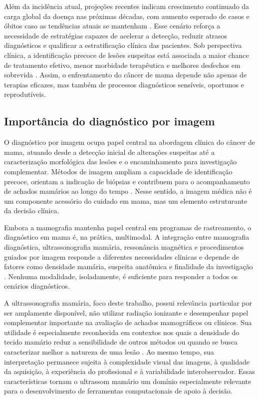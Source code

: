 \documentclass[tcc,capa]{texufpel}
\begin{document}
Além da incidência atual, projeções recentes indicam crescimento continuado da carga global da doença nas próximas décadas, com aumento esperado de casos e óbitos caso as tendências atuais se mantenham \cite{IARC2025}. Esse cenário reforça a necessidade de estratégias capazes de acelerar a detecção, reduzir atrasos diagnósticos e qualificar a estratificação clínica das pacientes. Sob perspectiva clínica, a identificação precoce de lesões suspeitas está associada a maior chance de tratamento efetivo, menor morbidade terapêutica e melhores desfechos em sobrevida \cite{WHOEarlyDiagnosis,INCADeteccao}. Assim, o enfrentamento do câncer de mama depende não apenas de terapias eficazes, mas também de processos diagnósticos sensíveis, oportunos e reprodutíveis.

\subsection{Importância do diagnóstico por imagem}

O diagnóstico por imagem ocupa papel central na abordagem clínica do câncer de mama, atuando desde a detecção inicial de alterações suspeitas até a caracterização morfológica das lesões e o encaminhamento para investigação complementar. Métodos de imagem ampliam a capacidade de identificação precoce, orientam a indicação de biópsias e contribuem para o acompanhamento de achados mamários ao longo do tempo \cite{INCADeteccao,INCADiretrizesMama}. Nesse sentido, a imagem médica não é um componente acessório do cuidado em mama, mas um elemento estruturante da decisão clínica.

Embora a mamografia mantenha papel central em programas de rastreamento, o diagnóstico em mama é, na prática, multimodal. A integração entre mamografia diagnóstica, ultrassonografia mamária, ressonância magnética e procedimentos guiados por imagem responde a diferentes necessidades clínicas e depende de fatores como densidade mamária, suspeita anatômica e finalidade da investigação \cite{INCADeteccao,IARCBreastAtlas}. Nenhuma modalidade, isoladamente, é suficiente para responder a todos os cenários diagnósticos.

A ultrassonografia mamária, foco deste trabalho, possui relevância particular por ser amplamente disponível, não utilizar radiação ionizante e desempenhar papel complementar importante na avaliação de achados mamográficos ou clínicos. Sua utilidade é especialmente reconhecida em contextos nos quais a densidade do tecido mamário reduz a sensibilidade de outros métodos ou quando se busca caracterizar melhor a natureza de uma lesão \cite{IARCBreastAtlas,INCAParametros}. Ao mesmo tempo, sua interpretação permanece sujeita à complexidade visual das imagens, à qualidade da aquisição, à experiência do profissional e à variabilidade interobservador. Essas características tornam o ultrassom mamário um domínio especialmente relevante para o desenvolvimento de ferramentas computacionais de apoio à decisão.
\end{document}
